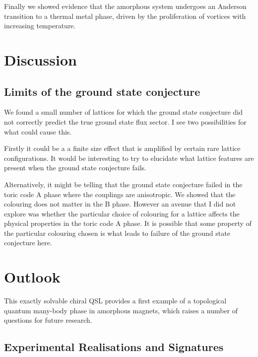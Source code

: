 Finally we showed evidence that the amorphous system undergoes an Anderson transition to a thermal metal phase, driven by the proliferation of vortices with increasing temperature.

\hypertarget{discussion}{%
\section{Discussion}\label{discussion}}

\hypertarget{limits-of-the-ground-state-conjecture}{%
\subsection{Limits of the ground state conjecture}\label{limits-of-the-ground-state-conjecture}}

We found a small number of lattices for which the ground state conjecture did not correctly predict the true ground state flux sector. I see two possibilities for what could cause this.

Firstly it could be a a finite size effect that is amplified by certain rare lattice configurations. It would be interesting to try to elucidate what lattice features are present when the ground state conjecture fails.

Alternatively, it might be telling that the ground state conjecture failed in the toric code A phase where the couplings are anisotropic. We showed that the colouring does not matter in the B phase. However an avenue that I did not explore was whether the particular choice of colouring for a lattice affects the physical properties in the toric code A phase. It is possible that some property of the particular colouring chosen is what leads to failure of the ground state conjecture here.

\hypertarget{outlook}{%
\section{Outlook}\label{outlook}}

This exactly solvable chiral QSL provides a first example of a topological quantum many-body phase in amorphous magnets, which raises a number of questions for future research.

\hypertarget{experimental-realisations-and-signatures}{%
\subsection{Experimental Realisations and Signatures}\label{experimental-realisations-and-signatures}}

